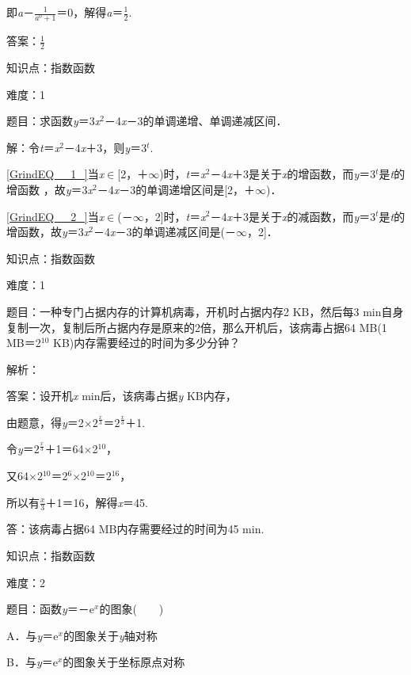 \documentclass{article} %
\begin{document}
即\textit{a}－$\frac{1}{a^{0}+1}$＝0，解得\textit{a}＝$\frac{1}{2}$.

答案：$\frac{1}{2}$

知识点：指数函数

难度：1

题目：求函数\textit{y}＝3\textit{x}${}^{2}$－4\textit{x}－3的单调递增、单调递减区间．

解：令\textit{t}＝\textit{x}${}^{2}$－4\textit{x}＋3，则\textit{y}＝3\textit{${}^{t}$}.

\eqref{GrindEQ__1_}当\textit{x}$\mathrm{\in}$[2，＋$\mathrm{\infty}$)时，\textit{t}＝\textit{x}${}^{2}$－4\textit{x}＋3是关于\textit{x}的增函数，而\textit{y}＝3\textit{${}^{t}$}是\textit{t}的增函数 ，故\textit{y}＝3\textit{x}${}^{2}$－4\textit{x}－3的单调递增区间是[2，＋$\mathrm{\infty}$)．

\eqref{GrindEQ__2_}当\textit{x}$\mathrm{\in}$(－$\mathrm{\infty}$，2]时，\textit{t}＝\textit{x}${}^{2}$－4\textit{x}＋3是关于\textit{x}的减函数，而\textit{y}＝3\textit{${}^{t}$}是\textit{t}的增函数，故\textit{y}＝3\textit{x}${}^{2}$－4\textit{x}－3的单调递减区间是(－$\mathrm{\infty}$，2]．

知识点：指数函数

难度：1

题目：一种专门占据内存的计算机病毒，开机时占据内存2 KB，然后每3 min自身复制一次，复制后所占据内存是原来的2倍，那么开机后，该病毒占据64 MB(1 MB＝2${}^{10}$ KB)内存需要经过的时间为多少分钟？

解析：

答案：设开机\textit{x} min后，该病毒占据\textit{y} KB内存，

由题意，得\textit{y}＝2$\mathrm{\times}$$2^{\frac{x}{3}}$＝$2^{\frac{x}{3}}$＋1.

令\textit{y}＝$2^{\frac{x}{3}}$＋1＝64$\mathrm{\times}$2${}^{10}$，

又64$\mathrm{\times}$2${}^{10}$＝2${}^{6}$$\mathrm{\times}$2${}^{10}$＝2${}^{16}$，

所以有$\frac{x}{3}$＋1＝16，解得\textit{x}＝45.

答：该病毒占据64 MB内存需要经过的时间为45 min.

知识点：指数函数

难度：2

题目：函数\textit{y}＝－e\textit{${}^{x}$}的图象(　　)

A．与\textit{y}＝e\textit{${}^{x}$}的图象关于\textit{y}轴对称

B．与\textit{y}＝e\textit{${}^{x}$}的图象关于坐标原点对称
\end{document}
